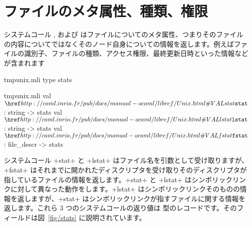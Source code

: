 \section{ファイルのメタ属性、種類、権限}

システムコール ,  および  はファイルについてのメタ属性、つまりそのファイルの内容についてではなくそのノード自身についての情報を返します。例えばファイルの識別子、ファイルの種類、アクセス権限、最終更新日時といった情報などが含まれます
%
\begin{codefile}{tmpunix.mli}
type stats
\end{codefile}
%
\begin{listingcodefile}{tmpunix.mli}
val $\libvalue{Unix}{stat}$  : string -> stats
val $\libvalue{Unix}{lstat}$ : string -> stats
val $\libvalue{Unix}{fstat}$ : file_descr -> stats
\end{listingcodefile}
%
システムコール \ml+stat+ と \ml+lstat+ はファイル名を引数として受け取りますが、\ml+fstat+ はそれまでに開かれたディスクリプタを受け取りそのディスクリプタが指しているファイルの情報を返します。\ml+stat+ と \ml+lstat+ はシンボリックリンクに対して異なった動作をします。\ml+lstat+ はシンボリックリンクそのものの情報を返しますが、\ml+stat+ はシンボリックリンクが指すファイルに関する情報を返します。これら 3 つのシステムコールの返り値は  型のレコードです。そのフィールドは図~\ref{fig/stats} に説明されています。
%
